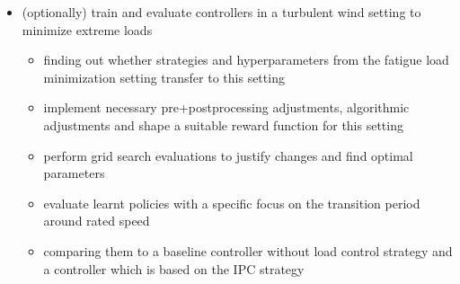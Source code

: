 \documentclass{article}
\begin{document}
\begin{itemize}
  \item (optionally) train and evaluate controllers in a turbulent wind setting to minimize extreme loads
  \begin{itemize}
    \item finding out whether strategies and hyperparameters from the fatigue load minimization setting transfer to this setting
    \item implement necessary pre+postprocessing adjustments, algorithmic adjustments and shape a suitable reward function for this setting
    \item perform grid search evaluations to justify changes and find optimal parameters
    \item evaluate learnt policies with a specific focus on the transition period around rated speed
    \item comparing them to a baseline controller without load control strategy and a controller which is based on the \ac{IPC} strategy
  \end{itemize}
\end{itemize}


{}

\end{document}
